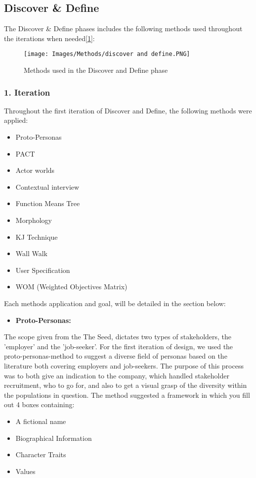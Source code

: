 \subsection{Discover \& Define}
The Discover \& Define phases includes the following methods used throughout the iterations when needed[\ref{DiscoverAndDefine}]: 

\begin{figure}[H]
\caption{Methods used in the Discover and Define phase}
\centering
\label{DiscoverAndDefine}
\texttt{[image: Images/Methods/discover and define.PNG]}
\end{figure}

\subsubsection{1. Iteration}
Throughout the first iteration of Discover and Define, the following methods were applied:
\begin{itemize}
    \item Proto-Personas
    \item PACT
    \item Actor worlds
    \item Contextual interview
    \item Function Means Tree
    \item Morphology
    \item KJ Technique 
    \item Wall Walk
    \item User Specification
    \item WOM (Weighted Objectives Matrix)
\end{itemize}

Each methods application and goal, will be detailed in the section below:

\begin{itemize}
    \item \bf{Proto-Personas:}
\end{itemize}

The scope given from the The Seed, dictates two types of stakeholders, the 'employer' and the 'job-seeker'. For the first iteration of design, we used the proto-personas-method to suggest a diverse field of personas based on the literature both covering employers and job-seekers. The purpose of this process was to both give an indication to the company, which handled stakeholder recruitment, who to go for, and also to get a visual grasp of the diversity within the populations in question. The method suggested a framework in which you fill out 4 boxes containing:
\begin{itemize}
    \item A fictional name
    \item Biographical Information
    \item Character Traits
    \item Values
\end{itemize}

